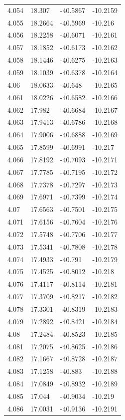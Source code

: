 \begin{tabular}{llll}
4.054 & 18.307 & -40.5867 & -10.2159 \\
4.055 & 18.2664 & -40.5969 & -10.216 \\
4.056 & 18.2258 & -40.6071 & -10.2161 \\
4.057 & 18.1852 & -40.6173 & -10.2162 \\
4.058 & 18.1446 & -40.6275 & -10.2163 \\
4.059 & 18.1039 & -40.6378 & -10.2164 \\
4.06 & 18.0633 & -40.648 & -10.2165 \\
4.061 & 18.0226 & -40.6582 & -10.2166 \\
4.062 & 17.982 & -40.6684 & -10.2167 \\
4.063 & 17.9413 & -40.6786 & -10.2168 \\
4.064 & 17.9006 & -40.6888 & -10.2169 \\
4.065 & 17.8599 & -40.6991 & -10.217 \\
4.066 & 17.8192 & -40.7093 & -10.2171 \\
4.067 & 17.7785 & -40.7195 & -10.2172 \\
4.068 & 17.7378 & -40.7297 & -10.2173 \\
4.069 & 17.6971 & -40.7399 & -10.2174 \\
4.07 & 17.6563 & -40.7501 & -10.2175 \\
4.071 & 17.6156 & -40.7604 & -10.2176 \\
4.072 & 17.5748 & -40.7706 & -10.2177 \\
4.073 & 17.5341 & -40.7808 & -10.2178 \\
4.074 & 17.4933 & -40.791 & -10.2179 \\
4.075 & 17.4525 & -40.8012 & -10.218 \\
4.076 & 17.4117 & -40.8114 & -10.2181 \\
4.077 & 17.3709 & -40.8217 & -10.2182 \\
4.078 & 17.3301 & -40.8319 & -10.2183 \\
4.079 & 17.2892 & -40.8421 & -10.2184 \\
4.08 & 17.2484 & -40.8523 & -10.2185 \\
4.081 & 17.2075 & -40.8625 & -10.2186 \\
4.082 & 17.1667 & -40.8728 & -10.2187 \\
4.083 & 17.1258 & -40.883 & -10.2188 \\
4.084 & 17.0849 & -40.8932 & -10.2189 \\
4.085 & 17.044 & -40.9034 & -10.219 \\
4.086 & 17.0031 & -40.9136 & -10.2191 \\

\end{tabular}
